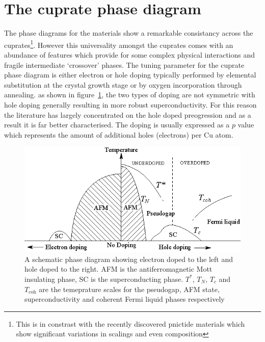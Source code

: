 \section{The cuprate phase diagram}

The phase diagrams for the \highTc materials show a remarkable consistancy across the cuprates\footnote{This is in constrast with the recently discovered pnictide materials which show significant variations in scalings and even composition}. However this universality amongst the cuprates comes with an abundance of features which provide for some complex physical interactions and fragile intermediate `crossover' phases. The tuning parameter for the cuprate phase diagram is either electron or hole doping typically performed by elemental substitution at the crystal growth stage or by oxygen incorporation through annealing. as shown in figure~\ref{Fig:Intro:ElecHolePhaseDiagram}, the two types of doping are not symmetric with hole doping generally resulting in more robust superconductivity. For this reason the literature has largely concentrated on the hole doped preogression and as a result it is far better characterised. The doping is usually expressed as a $p$ value which represents the amount of additional holes (electrons) per Cu atom.
\begin{figure}[htbp]
    \begin{center}
        \includegraphics[scale=0.9]{Chapter-Introduction/Figures/ElecHolePhaseDiagram/ElecHolePhaseDiagram}
        \caption{A schematic phase diagram showing electron doped to the left and hole doped to the right. AFM is the antiferromagnetic Mott insulating phase, SC is the superconducting phase. $T^*$, $T_N$, $T_c$ and $T_{\textrm{coh}}$ are the temeprature scales for the pseudogap, AFM state, superconductivity and coherent Fermi liquid phases respectively}
        \label{Fig:Intro:ElecHolePhaseDiagram}
    \end{center}
\end{figure}

